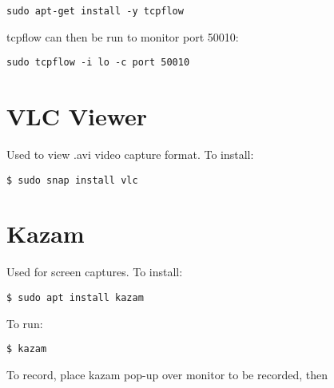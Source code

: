 \begin{verbatim}
sudo apt-get install -y tcpflow    
\end{verbatim}

tcpflow can then be run to monitor port 50010:
\begin{verbatim}
sudo tcpflow -i lo -c port 50010  
\end{verbatim}

\section{VLC Viewer}
Used to view .avi video capture format. To install:
\begin{verbatim}
$ sudo snap install vlc
\end{verbatim}

\section{Kazam}
Used for screen captures. To install:
\begin{verbatim}
$ sudo apt install kazam    
\end{verbatim}
To run:
\begin{verbatim}
$ kazam
\end{verbatim}
To record, place kazam pop-up over monitor to be recorded, then 













